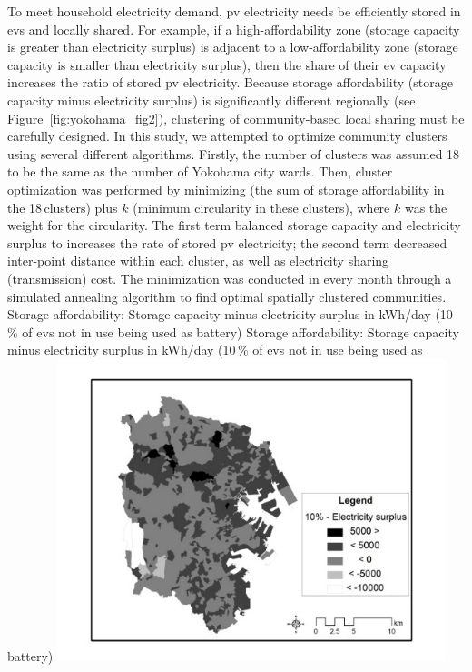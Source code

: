 To meet household electricity demand, \gls{pv} electricity needs be efficiently stored in \glspl{ev} and locally shared. For example, if a high-affordability zone (storage capacity is greater than electricity surplus) is adjacent to a low-affordability zone (storage capacity is smaller than electricity surplus), then the share of their \gls{ev} capacity increases the ratio of stored \gls{pv} electricity. Because storage affordability (storage capacity minus electricity surplus) is significantly different regionally (see Figure~\ref{fig:yokohama_fig2}), clustering of  community-based local sharing must be carefully designed. In this study, we attempted to optimize community clusters using several different algorithms. Firstly, the number of clusters was assumed 18 to be the same as the number of Yokohama city wards. Then, cluster optimization was performed by minimizing (the sum of storage affordability in the 18\,clusters) plus $k$ (minimum circularity in these clusters), where $k$ was the weight for the circularity. The first term balanced storage capacity and electricity surplus to increases the rate of stored \gls{pv} electricity; the second term decreased inter-point distance within each cluster, as well as electricity sharing (transmission) cost. The minimization was conducted in every month through a simulated annealing algorithm to find optimal spatially clustered communities.
%
\createfigure%
{Storage affordability: Storage capacity minus electricity surplus in kWh/day (10\,\% of \glspl{ev} not in use being used as battery)}%
{Storage affordability: Storage capacity minus electricity surplus in kWh/day (10\,\% of \glspl{ev} not in use being used as battery)}%
{\label{fig:yokohama_fig2}}%
{\includegraphics[width=0.85\textwidth, angle=0]{./scenarios/figures/yokohama_fig2.png}}%
